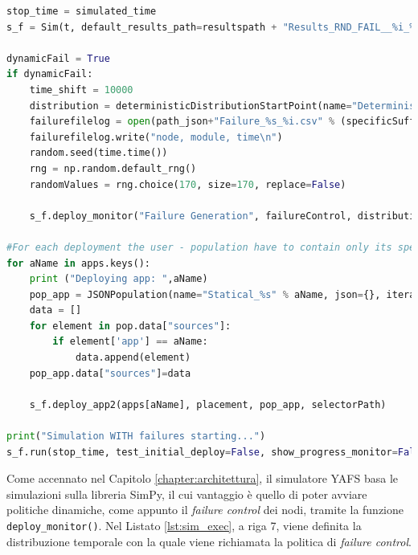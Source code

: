 \begin{lstlisting}[language=python, caption={Creazione della simulazione.}, label={lst:sim_exec}, captionpos=b]
stop_time = simulated_time
s_f = Sim(t, default_results_path=resultspath + "Results_RND_FAIL__%i_%i" % (stop_time,it)) 

dynamicFail = True
if dynamicFail:
    time_shift = 10000
    distribution = deterministicDistributionStartPoint(name="Deterministic", time=time_shift,start=10000)
    failurefilelog = open(path_json+"Failure_%s_%i.csv" % (specificSuffix,stop_time),"w")
    failurefilelog.write("node, module, time\n")
    random.seed(time.time())
    rng = np.random.default_rng()
    randomValues = rng.choice(170, size=170, replace=False)
    
    s_f.deploy_monitor("Failure Generation", failureControl, distribution,sim=s,filelog=failurefilelog,ids=randomValues)

#For each deployment the user - population have to contain only its specific sources
for aName in apps.keys():
    print ("Deploying app: ",aName)
    pop_app = JSONPopulation(name="Statical_%s" % aName, json={}, iteration=it)
    data = []
    for element in pop.data["sources"]:
        if element['app'] == aName:
            data.append(element)
    pop_app.data["sources"]=data

    s_f.deploy_app2(apps[aName], placement, pop_app, selectorPath)

print("Simulation WITH failures starting...")
s_f.run(stop_time, test_initial_deploy=False, show_progress_monitor=False)
\end{lstlisting}

Come accennato nel Capitolo \ref{chapter:architettura}, il simulatore YAFS basa le simulazioni sulla libreria SimPy, il cui vantaggio è quello di poter avviare politiche dinamiche, come appunto il \textit{failure control} dei nodi, tramite la funzione \texttt{deploy\_monitor()}. Nel Listato \ref{lst:sim_exec}, a riga 7, viene definita la distribuzione temporale con la quale viene richiamata la politica di \textit{failure control}.